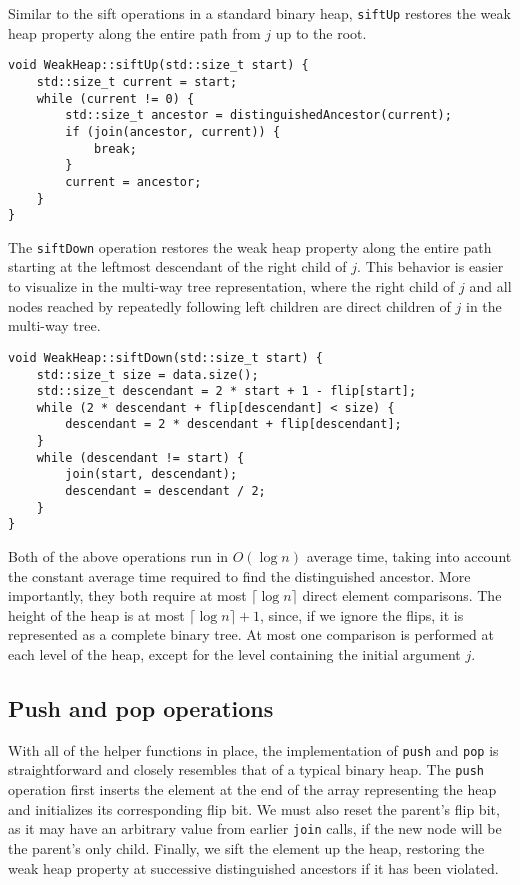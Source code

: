 Similar to the sift operations in a standard binary heap, \texttt{siftUp} restores the weak heap property along the entire path from \(j\) up to the root.

\begin{verbatim}
void WeakHeap::siftUp(std::size_t start) {
    std::size_t current = start;
    while (current != 0) {
        std::size_t ancestor = distinguishedAncestor(current);
        if (join(ancestor, current)) {
            break;
        }
        current = ancestor;
    }
}
\end{verbatim}

The \texttt{siftDown} operation restores the weak heap property along the entire path starting at the leftmost descendant of the right child of \(j\). This behavior is easier to visualize in the multi-way tree representation, where the right child of \(j\) and all nodes reached by repeatedly following left children are direct children of \(j\) in the multi-way tree.

\begin{verbatim}
void WeakHeap::siftDown(std::size_t start) {
    std::size_t size = data.size();
    std::size_t descendant = 2 * start + 1 - flip[start];
    while (2 * descendant + flip[descendant] < size) {
        descendant = 2 * descendant + flip[descendant];
    }
    while (descendant != start) {
        join(start, descendant);
        descendant = descendant / 2;
    }
}
\end{verbatim}

Both of the above operations run in \(O(\log n)\) average time, taking into account the constant average time required to find the distinguished ancestor. More importantly, they both require at most \( \lceil \log n \rceil \) direct element comparisons. The height of the heap is at most \( \lceil \log n \rceil + 1 \), since, if we ignore the flips, it is represented as a complete binary tree. At most one comparison is performed at each level of the heap, except for the level containing the initial argument \(j\).

\subsection{Push and pop operations}

With all of the helper functions in place, the implementation of \texttt{push} and \texttt{pop} is straightforward and closely resembles that of a typical binary heap. The \texttt{push} operation first inserts the element at the end of the array representing the heap and initializes its corresponding flip bit. We must also reset the parent's flip bit, as it may have an arbitrary value from earlier \texttt{join} calls, if the new node will be the parent's only child. Finally, we sift the element up the heap, restoring the weak heap property at successive distinguished ancestors if it has been violated.

